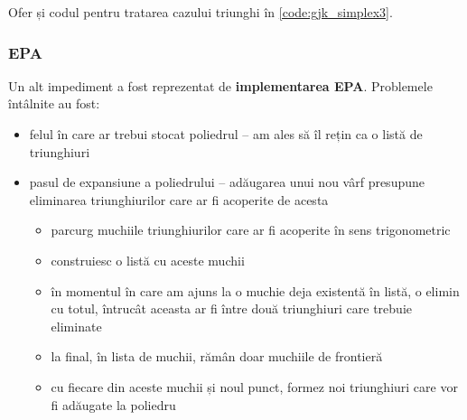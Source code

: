 \documentclass[12pt,a4paper]{report}
\begin{document}
Ofer și codul pentru tratarea cazului triunghi în \autoref{code:gjk_simplex3}.
\subsubsection{EPA}

Un alt impediment a fost reprezentat de \textbf{implementarea EPA}. Problemele întâlnite au fost:
\begin{itemize}
	\item felul în care ar trebui stocat poliedrul -- am ales să îl rețin ca o listă de triunghiuri
	\item pasul de expansiune a poliedrului -- adăugarea unui nou vârf presupune eliminarea  triunghiurilor care ar fi acoperite de acesta
	\begin{itemize}
		\item parcurg muchiile triunghiurilor care ar fi acoperite în sens trigonometric
		\item construiesc o listă cu aceste muchii
		\item în momentul în care am ajuns la o muchie deja existentă în listă, o elimin cu totul, întrucât aceasta ar fi între două triunghiuri care trebuie eliminate
		\item la final, în lista de muchii, rămân doar muchiile de frontieră
		\item cu fiecare din aceste muchii și noul punct, formez noi triunghiuri care vor fi adăugate la poliedru
	\end{itemize}
\end{itemize}
\end{document}
